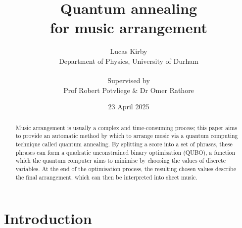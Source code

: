 \documentclass[12pt]{article}
\title{\Huge \bfseries Quantum annealing\\for music arrangement}
\author{Lucas Kirby\\\normalsize Department of Physics, University of Durham\\\\\normalsize Supervised by\\\normalsize Prof Robert Potvliege \& Dr Omer Rathore}
\date{\normalsize 23 April 2025}
\theoremstyle{definition}
\begin{document}
\maketitle

\vfill

\begin{abstract}              

Music arrangement is usually a complex and time-consuming process; this paper aims to provide an automatic method by which to arrange music via a quantum computing technique called quantum annealing. By splitting a score into a set of phrases, these phrases can form a quadratic unconstrained binary optimisation (QUBO), a function which the quantum computer aims to minimise by choosing the values of discrete variables. At the end of the optimisation process, the resulting chosen values describe the final arrangement, which can then be interpreted into sheet music.

\end{abstract}

\vfill

\begin{center}
    
\end{center}

\thispagestyle{empty}
\clearpage

\tableofcontents

\thispagestyle{empty}
\clearpage

\section{Introduction}
\end{document}
